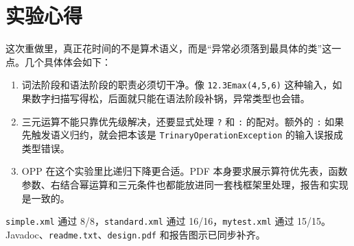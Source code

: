 \documentclass[12pt,a4paper,fontset=none]{ctexart}
\begin{document}
\section{实验心得}

这次重做里，真正花时间的不是算术语义，而是“异常必须落到最具体的类”这一点。几个具体体会如下：

\begin{enumerate}
  \item 词法阶段和语法阶段的职责必须切干净。像 \texttt{12.3Emax(4,5,6)} 这种输入，如果数字扫描写得松，后面就只能在语法阶段补锅，异常类型也会错。
  \item 三元运算不能只靠优先级解决，还要显式处理 \texttt{?} 和 \texttt{:} 的配对。额外的 \texttt{:} 如果先触发语义归约，就会把本该是 \texttt{TrinaryOperationException} 的输入误报成类型错误。
  \item OPP 在这个实验里比递归下降更合适。PDF 本身要求展示算符优先表，函数参数、右结合幂运算和三元条件也都能放进同一套栈框架里处理，报告和实现是一致的。
\end{enumerate}

\begin{summaryBox}
\texttt{simple.xml} 通过 8/8，\texttt{standard.xml} 通过 16/16，\texttt{mytest.xml} 通过 15/15。
Javadoc、\texttt{readme.txt}、\texttt{design.pdf} 和报告图示已同步补齐。
\end{summaryBox}
\end{document}
